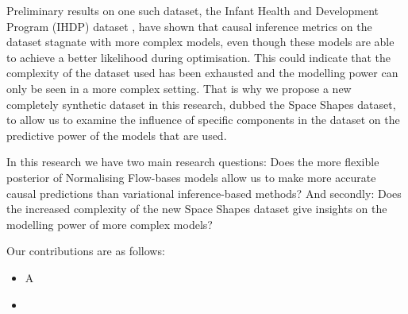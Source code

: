\documentclass{report}
\begin{document}
Preliminary results on one such dataset, the Infant Health and Development Program (IHDP) dataset \cite{hill2011bayesian}, have shown that causal inference metrics on the dataset stagnate with more complex models, even though these models are able to achieve a better likelihood during optimisation. This could indicate that the complexity of the dataset used has been exhausted and the modelling power can only be seen in a more complex setting. That is why we propose a new completely synthetic dataset in this research, dubbed the Space Shapes dataset, to allow us to examine the influence of specific components in the dataset on the predictive power of the models that are used.

In this research we have two main research questions: Does the more flexible posterior of Normalising Flow-bases models allow us to make more accurate causal predictions than variational inference-based methods? And secondly: Does the increased complexity of the new Space Shapes dataset give insights on the modelling power of more complex models?

Our contributions are as follows:
\begin{itemize}
    \item A
    \item 
\end{itemize}
    
    
     
     
     
\end{document}
